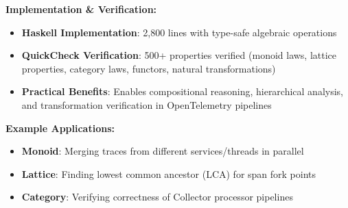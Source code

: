 \begin{table}[t]
\vspace{0.2cm}

\textbf{Implementation \& Verification:}
\begin{itemize}[leftmargin=*, noitemsep, topsep=2pt]
    \item \textbf{Haskell Implementation}: 2,800 lines with type-safe algebraic operations
    \item \textbf{QuickCheck Verification}: 500+ properties verified (monoid laws, lattice properties, category laws, functors, natural transformations)
    \item \textbf{Practical Benefits}: Enables compositional reasoning, hierarchical analysis, and transformation verification in OpenTelemetry pipelines
\end{itemize}

\vspace{0.2cm}

\textbf{Example Applications:}
\begin{itemize}[leftmargin=*, noitemsep, topsep=2pt]
    \item \textbf{Monoid}: Merging traces from different services/threads in parallel
    \item \textbf{Lattice}: Finding lowest common ancestor (LCA) for span fork points
    \item \textbf{Category}: Verifying correctness of Collector processor pipelines
\end{itemize}
\end{table}

